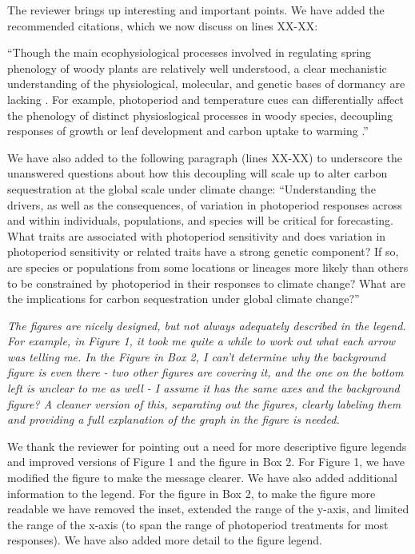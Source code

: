 \documentclass{article}
\begin{document}
\par  The reviewer brings up interesting and important points. We have added the recommended citations, which we now  discuss on lines XX-XX:

``Though the main ecophysiological processes involved in regulating spring phenology of woody plants are relatively well understood, a clear mechanistic understanding of the physiological, molecular, and genetic bases of dormancy are lacking \citep[Box 2][]{hanninen2019, chuine2016}. For example, photoperiod and temperature cues can differentially affect the phenology of distinct physioslogical processes in woody species, decoupling responses of growth or leaf development and carbon uptake to warming \citep{bauerle2012,stinziano2017}.''

\par We have also added to the following paragraph (lines XX-XX) to underscore the unanswered questions about how this decoupling will scale up to alter carbon sequestration at the global scale under climate change:
``Understanding the drivers, as well as the consequences, of variation in photoperiod responses across  and within individuals, populations, and species will be critical for forecasting.  What traits are associated with photoperiod sensitivity and does variation in photoperiod sensitivity or related traits have a strong genetic component? If so, are species or populations from some locations or lineages more likely than others to be constrained by photoperiod in their responses to climate change? What are the implications for carbon sequestration under global climate change?''


\par \emph{The figures are nicely designed, but not always adequately described in the legend. For example, in Figure 1, it took me quite a while to work out what each arrow was telling me. In the Figure in Box 2, I can't determine why the background figure is even there - two other figures are covering it, and the one on the bottom left is unclear to me as well - I assume it has the same axes and the background figure? A cleaner version of this, separating out the figures, clearly labeling them and providing a full explanation of the graph in the figure is needed.}

\par We thank the reviewer for pointing out a need for more descriptive figure legends and improved versions of Figure 1 and the figure in Box 2.
For Figure 1, we have modified the figure to make the message clearer. We have also added additional information to the legend.
For the figure in Box 2,  to make the figure more readable we have removed the inset, extended the range of the y-axis, and limited the range of the x-axis (to span the range of photoperiod treatments for most responses). We have also added more detail to the figure legend.
\end{document}
